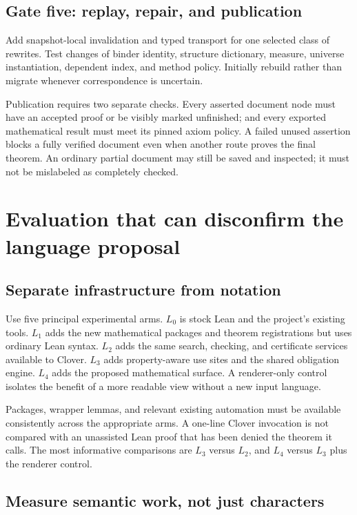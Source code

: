 \documentclass[11pt,a4paper]{article}
\theoremstyle{definition}
\theoremstyle{remark}
\begin{document}
\subsection{Gate five: replay, repair, and publication}

Add snapshot-local invalidation and typed transport for one selected class of
rewrites. Test changes of binder identity, structure dictionary, measure,
universe instantiation, dependent index, and method policy. Initially rebuild
rather than migrate whenever correspondence is uncertain.

Publication requires two separate checks. Every asserted document node must
have an accepted proof or be visibly marked unfinished; and every exported
mathematical result must meet its pinned axiom policy. A failed unused assertion
blocks a fully verified document even when another route proves the final
theorem. An ordinary partial document may still be saved and inspected; it must
not be mislabeled as completely checked.

\section{Evaluation that can disconfirm the language proposal}\label{sec:evaluation}

\subsection{Separate infrastructure from notation}

Use five principal experimental arms. $L_0$ is stock Lean and the project's
existing tools. $L_1$ adds the new mathematical packages and theorem registrations
but uses ordinary Lean syntax. $L_2$ adds the same search, checking, and certificate
services available to Clover. $L_3$ adds property-aware use sites and the shared
obligation engine. $L_4$ adds the proposed mathematical surface. A renderer-only
control isolates the benefit of a more readable view without a new input
language.

Packages, wrapper lemmas, and relevant existing automation must be available
consistently across the appropriate arms. A one-line Clover invocation is not
compared with an unassisted Lean proof that has been denied the theorem it calls.
The most informative comparisons are $L_3$ versus $L_2$, and $L_4$ versus
$L_3$ plus the renderer control.

\subsection{Measure semantic work, not just characters}
\end{document}
